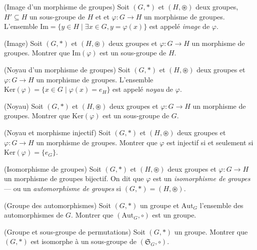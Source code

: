 \begin{defn}(Image d'un morphisme de groupes)
Soit $(G, \ast)$ et $(H, \circledast)$ deux groupes,
$H' \subseteq H$ un sous-groupe de $H$ et
et $\varphi : G \to H$ un morphisme de groupes.
L'ensemble $\mathrm{Im} = \{y \in H \mid \exists x \in G, y = \varphi(x)\}$
est appelé \emph{image} de $\varphi$.
\end{defn}

\begin{exo}(Image)
Soit $(G, \ast)$ et $(H, \circledast)$ deux groupes et
$\varphi : G \to H$ un morphisme de groupes.
Montrer que $\mathrm{Im}(\varphi)$ est un sous-groupe de $H$.
\end{exo}

\begin{defn}(Noyau d'un morphisme de groupes)
Soit $(G, \ast)$ et $(H, \circledast)$ deux groupes
et $\varphi : G \to H$ un morphisme de groupes.
L'ensemble $\mathrm{Ker}(\varphi) = \{x \in G \mid \varphi(x) = e_H\}$
est appelé \emph{noyau} de $\varphi$.
\end{defn}

\begin{exo}(Noyau)
Soit $(G, \ast)$ et $(H, \circledast)$ deux groupes et
$\varphi : G \to H$ un morphisme de groupes.
Montrer que $\mathrm{Ker}(\varphi)$ est un sous-groupe de $G$.
\end{exo}

\begin{exo}(Noyau et morphisme injectif)
Soit $(G, \ast)$ et $(H, \circledast)$ deux groupes et
$\varphi : G \to H$ un morphisme de groupes.
Montrer que $\varphi$ est injectif si et seulement si $\mathrm{Ker}(\varphi) = \{e_G\}$.
\end{exo}

\begin{defn}(Isomorphisme de groupes)
Soit $(G, \ast)$ et $(H, \circledast)$ deux groupes
et $\varphi : G \to H$ un morphisme de groupes bijectif.
On dit que $\varphi$ est un \emph{isomorphisme de groupes} ---
ou un \emph{automorphisme de groupes} si $(G, \ast) = (H, \circledast)$.
\end{defn}

\begin{exo}(Groupe des automorphismes)
Soit $(G, \ast)$ un groupe et $\mathrm{Aut}_G$ l'ensemble des automorphismes de $G$.
Montrer que $(\mathrm{Aut}_G, \circ)$ est un groupe.
\end{exo}

\begin{exo}(Groupe et sous-groupe de permutations)
Soit $(G, \ast)$ un groupe.
Montrer que $(G,\ast)$ est isomorphe à un sous-groupe de $(\mathfrak{S}_G, \circ)$.
\end{exo}

